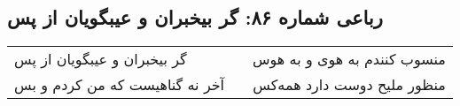 \begin{center}
\section*{رباعی شماره ۸۶: گر بیخبران و عیبگویان از پس}
\label{sec:086}
\begin{longtable}{l p{0.5cm} r}
گر بیخبران و عیبگویان از پس
&&
منسوب کنندم به هوی و به هوس
\\
آخر نه گناهیست که من کردم و بس
&&
منظور ملیح دوست دارد همه‌کس
\\
\end{longtable}
\end{center}
